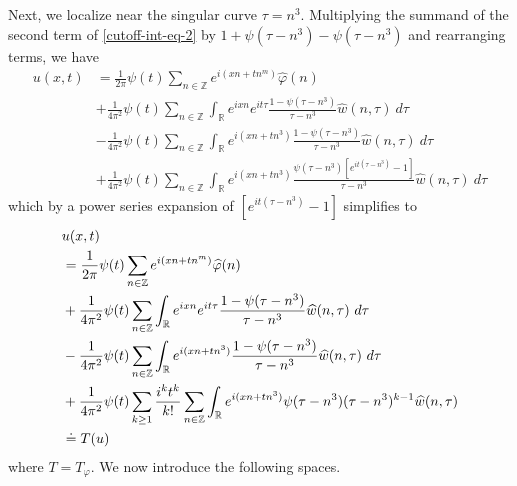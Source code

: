 \documentclass[12pt,reqno]{amsart}
\numberwithin{equation}{section}  %
\numberwithin{figure}{section}
\newcommand{\rr}{\mathbb{R}}
\newcommand{\zz}{\mathbb{Z}}
\newcommand{\wh}{\widehat}
\newcommand{\vp}{\varphi}
\theoremstyle{plain}
\theoremstyle{definition}
\theoremstyle{remark}
\begin{document}
%
%
%
%
%
Next, we localize near the singular curve $\tau =  n^3$.  Multiplying the
summand of the second term of \eqref{cutoff-int-eq-2} by $1 + \psi(\tau -
n^3) - \psi(\tau -
n^3) $ and
rearranging terms, we have
%
%
\begin{equation*}
	\begin{split}
		 u(x, t)
		& = \frac{1}{2 \pi} \psi(t) \sum_{n \in \zz} e^{i(xn + t n^{m 
		})} \widehat{\vp}(n) 
		\\
		& + \frac{1}{4 \pi^2} \psi(t) \sum_{n \in \zz} \int_\rr e^{ixn}  
		e^{it \tau} \frac{ 1 - \psi(\tau - n^3) 
		}{\tau - n^3} \wh{w}(n, \tau) \ d \tau
		\\
		& - \frac{1}{4 \pi^2} \psi(t) \sum_{n \in \zz} \int _\rr e^{i(xn + 
		t n^3)}
		 \frac{1- \psi(\tau - n^3)}{\tau - n^3} \wh{w}(n, \tau) \ d \tau
		\\
		& + \frac{1}{4 \pi^2} \psi(t) \sum_{n \in \zz} \int_\rr
		e^{i(xn + t n^3)}
		\frac{\psi(\tau - n^3)\left[ e^{it(\tau - n^3)}-1 
		\right]}{\tau - n^3} \wh{w}(n, \tau) \ d \tau
	\end{split}
\end{equation*}
%
%
which by a power series expansion of $[e^{it(\tau - n^3)}-1]$ simplifies  
to
%
%
\begin{align}
	\label{main-int-expression-0}
	& u(x, t) 
		\\
		\label{main-int-expression-1}
		& = \frac{1}{2 \pi} \psi(t) \sum_{n \in \zz} e^{i(xn + tn^{m 
		})} \widehat{\vp}(n) 
		\\
		\label{main-int-expression-2}
		& + \frac{1}{4 \pi^2} \psi(t) \sum_{n\in \zz} \int_\rr e^{ixn}  
		e^{it \tau} \frac{ 1 - \psi(\tau -  n^3) 
		}{\tau -  n^3} \wh{w}(n, \tau) \ d \tau
		\\
		\label{main-int-expression-3}
		& - \frac{1}{4 \pi^2} \psi(t) \sum_{n\in \zz} \int_\rr e^{i(xn + 
		t n^3)}
		 \frac{1- \psi(\tau -  n^3)}{\tau -  n^3} \wh{w}(n, \tau) \ d \tau
		\\
		\label{main-int-expression-4}
		& + \frac{1}{4 \pi^2} \psi(t) \sum_{k \ge 1} \frac{i^k t^k}{k!}
		\sum_{n \in \zz} \int_\rr e^{i(xn + t n^3 )}
		\psi(\tau -  n^3) (\tau -  n^3)^{k-1} \wh{w}(n, \tau)  
		\\
		& \doteq T(u) \notag
\end{align}
%
%
where $T = T_{\vp}$. We now introduce the following spaces. 
\end{document}
